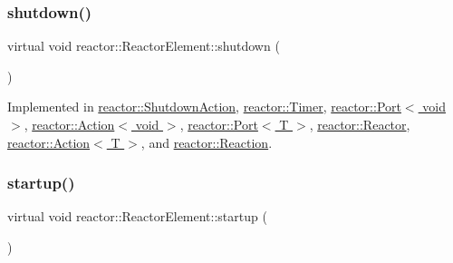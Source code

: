 \mbox{\label{classreactor_1_1ReactorElement_a8fce084bef582156979ebba56737e907}} 
\subsubsection{\texorpdfstring{shutdown()}{shutdown()}}
{\footnotesize\ttfamily virtual void reactor\+::\+Reactor\+Element\+::shutdown (\begin{DoxyParamCaption}{ }\end{DoxyParamCaption})\hspace{0.3cm}{\ttfamily [pure virtual]}}



Implemented in \hyperlink{classreactor_1_1ShutdownAction_a8950ffd9b67f4800b75a95af92c4fd2a}{reactor\+::\+Shutdown\+Action}, \hyperlink{classreactor_1_1Timer_a35f218aab3bf72b87cff4aa984dee991}{reactor\+::\+Timer}, \hyperlink{classreactor_1_1Port_3_01void_01_4_ad7d9028d091509215b3685e4af95cb03}{reactor\+::\+Port$<$ void $>$}, \hyperlink{classreactor_1_1Action_3_01void_01_4_a871645e568af7688eeacefbb65be4489}{reactor\+::\+Action$<$ void $>$}, \hyperlink{classreactor_1_1Port_a3d440102c643fd98d17b4cf8714c910d}{reactor\+::\+Port$<$ T $>$}, \hyperlink{classreactor_1_1Reactor_ac65caf31e633bd76c45c794072afb56e}{reactor\+::\+Reactor}, \hyperlink{classreactor_1_1Action_a5e6698cc0893efca3a088f2158345b9c}{reactor\+::\+Action$<$ T $>$}, and \hyperlink{classreactor_1_1Reaction_ae4011cf04c0d7158ffd1360fb00bcc29}{reactor\+::\+Reaction}.

\mbox{\label{classreactor_1_1ReactorElement_a8cb574cb20ff963903ad905fb0a157e3}} 
\subsubsection{\texorpdfstring{startup()}{startup()}}
{\footnotesize\ttfamily virtual void reactor\+::\+Reactor\+Element\+::startup (\begin{DoxyParamCaption}{ }\end{DoxyParamCaption})\hspace{0.3cm}{\ttfamily [pure virtual]}}



